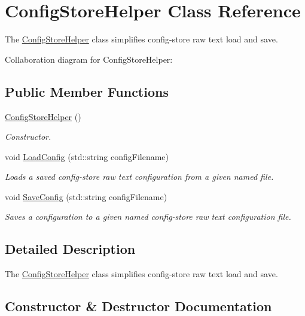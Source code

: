 \hypertarget{classConfigStoreHelper}{}\section{Config\+Store\+Helper Class Reference}
\label{classConfigStoreHelper}


The \hyperlink{classConfigStoreHelper}{Config\+Store\+Helper} class simplifies config-\/store raw text load and save.  




Collaboration diagram for Config\+Store\+Helper\+:
\subsection*{Public Member Functions}
\begin{DoxyCompactItemize}
\item 
\hyperlink{classConfigStoreHelper_a4b2ba72bd7b5d73a4f444b1f9f5a84b9}{Config\+Store\+Helper} ()
\begin{DoxyCompactList}\small\item\em Constructor. \end{DoxyCompactList}\item 
void \hyperlink{classConfigStoreHelper_ae554baffed15b2ae8b5fcd1bfcdd1579}{Load\+Config} (std\+::string config\+Filename)
\begin{DoxyCompactList}\small\item\em Loads a saved config-\/store raw text configuration from a given named file. \end{DoxyCompactList}\item 
void \hyperlink{classConfigStoreHelper_a082384175bdd6469787faca2b212a6ec}{Save\+Config} (std\+::string config\+Filename)
\begin{DoxyCompactList}\small\item\em Saves a configuration to a given named config-\/store raw text configuration file. \end{DoxyCompactList}\end{DoxyCompactItemize}


\subsection{Detailed Description}
The \hyperlink{classConfigStoreHelper}{Config\+Store\+Helper} class simplifies config-\/store raw text load and save. 

\subsection{Constructor \& Destructor Documentation}
